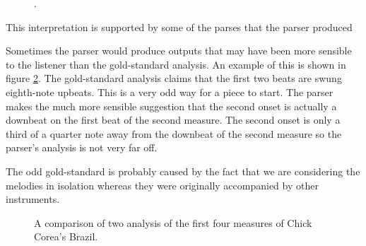 \begin{figure}
\centering
{}
\caption{.}
\label{fig:discuss1}
\end{figure}


This interpretation is supported by some of the parses that the parser produced 


Sometimes the parser would produce outputs that may have been more sensible to the listener than the gold-standard analysis. An example of this is shown in figure \ref{fig:comparison}. The gold-standard analysis claims that the first two beats are swung eighth-note upbeats. This is a very odd way for a piece to start. The parser makes the much more sensible suggestion that the second onset is actually a downbeat on the first beat of the second measure. The second onset is only a third of a quarter note away from the downbeat of the second measure so the parser's analysis is not very far off. 

The odd gold-standard is probably caused by the fact that we are considering the melodies in isolation whereas they were originally accompanied by other instruments.
\begin{figure}
\centering
{}

\caption{A comparison of two analysis of the first four measures of Chick Corea's Brazil.}
\label{fig:comparison}
\end{figure}

